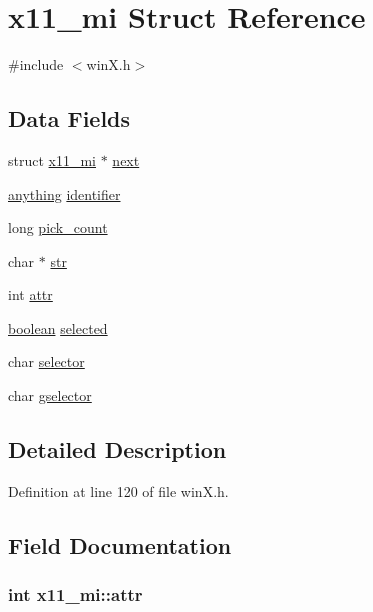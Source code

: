 \hypertarget{structx11__mi}{\section{x11\+\_\+mi Struct Reference}
\label{structx11__mi}
}


{\ttfamily \#include $<$win\+X.\+h$>$}

\subsection*{Data Fields}
\begin{DoxyCompactItemize}
\item 
struct \hyperlink{structx11__mi}{x11\+\_\+mi} $\ast$ \hyperlink{structx11__mi_a30ef44cd1db7f059c3ea38ff354ca3c7}{next}
\item 
\hyperlink{wintype_8h_a49720928e6af182ee38aa332d0483b2a}{anything} \hyperlink{structx11__mi_a80d53847aac61da4300f9fd5690b97f7}{identifier}
\item 
long \hyperlink{structx11__mi_a8ac48ec61fd5a7ff698e446261aef123}{pick\+\_\+count}
\item 
char $\ast$ \hyperlink{structx11__mi_a9a83733faede9dce800417224d72b8cc}{str}
\item 
int \hyperlink{structx11__mi_a602e33394ff2875371fc4bb71534b017}{attr}
\item 
\hyperlink{global_8h_a531b10dd351aa162d7dcccd1966308b8}{boolean} \hyperlink{structx11__mi_a902f7ae6edb62076a998bcb9fb848fb1}{selected}
\item 
char \hyperlink{structx11__mi_aebb497676a238d95ae96abc951958c48}{selector}
\item 
char \hyperlink{structx11__mi_a5b55248468ee6afbab99a22e5faacfe9}{gselector}
\end{DoxyCompactItemize}


\subsection{Detailed Description}


Definition at line 120 of file win\+X.\+h.



\subsection{Field Documentation}
\hypertarget{structx11__mi_a602e33394ff2875371fc4bb71534b017}{
\subsubsection[{attr}]{\setlength{\rightskip}{0pt plus 5cm}int x11\+\_\+mi\+::attr}}\label{structx11__mi_a602e33394ff2875371fc4bb71534b017}


